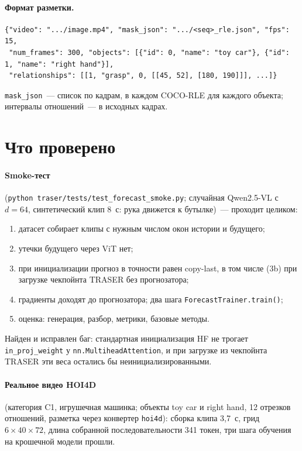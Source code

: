 \documentclass[11pt,a4paper]{article}
\newcommand{\code}[1]{\texttt{#1}}
\begin{document}
\paragraph{Формат разметки.}
\begin{lstlisting}
{"video": ".../image.mp4", "mask_json": ".../<seq>_rle.json", "fps": 15,
 "num_frames": 300, "objects": [{"id": 0, "name": "toy car"}, {"id": 1, "name": "right hand"}],
 "relationships": [[1, "grasp", 0, [[45, 52], [180, 190]]], ...]}
\end{lstlisting}
\code{mask\_json}~--- список по кадрам, в каждом COCO-RLE для каждого объекта; интервалы
отношений~--- в исходных кадрах.

\section{Что проверено}

\paragraph{Smoke-тест} (\code{python traser/tests/test\_forecast\_smoke.py}; случайная
Qwen2.5-VL с $d=64$, синтетический клип 8~с: рука движется к бутылке)~--- проходит целиком:
\begin{enumerate}[label=\arabic*.]
  \item датасет собирает клипы с нужным числом окон истории и будущего;
  \item утечки будущего через ViT нет;
  \item при инициализации прогноз в точности равен copy-last, в том числе
        (3b) при загрузке чекпойнта TRASER без прогнозатора;
  \item градиенты доходят до прогнозатора; два шага \code{ForecastTrainer.train()};
  \item оценка: генерация, разбор, метрики, базовые методы.
\end{enumerate}
Найден и исправлен баг: стандартная инициализация HF не трогает \code{in\_proj\_weight} у
\code{nn.MultiheadAttention}, и при загрузке из чекпойнта TRASER эти веса остались бы
неинициализированными.

\paragraph{Реальное видео HOI4D} (категория C1, игрушечная машинка; объекты toy car и right
hand, 12 отрезков отношений, разметка через конвертер \code{hoi4d}): сборка клипа 3,7~с,
грид $6\times40\times72$, длина собранной последовательности 341 токен, три шага обучения
на крошечной модели прошли.
\end{document}
